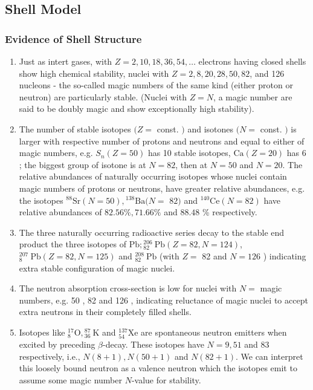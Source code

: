 \subsection{Shell Model}
\subsubsection{Evidence of Shell Structure}
\begin{enumerate}
	\item Just as intert gases, with $Z=2,10,18,36,54, \ldots$ electrons having closed shells show high chemical stability, nuclei with $Z=2,8,20,28,50,82$, and 126 nucleons - the so-called magic numbers of the same kind (either proton or neutron) are particularly stable. (Nuclei with $Z=N$, a magic number are said to be doubly magic and show exceptionally high stability).
	\item The number of stable isotopes $(Z=$ const. $)$ and isotones $(N=$ const. $)$ is larger with respective number of protons and neutrons and equal to either of magic numbers, e.g. $S_{n}(Z=50)$ has 10 stable isotopes, $\mathrm{Ca}(Z=20)$ has 6 ; the biggest group of isotone is at $N=82$, then at $N=50$ and $N=20$. The relative abundances of naturally occurring isotopes whose nuclei contain magic numbers of protons or neutrons, have greater relative abundances, e.g. the isotopes ${ }^{88} \mathrm{Sr}(N=50),{ }^{138} \mathrm{Ba}(N=$ $82)$ and ${ }^{140} \mathrm{Ce}(N=82)$ have relative abundances of $82.56 \%, 71.66 \%$ and $88.48$ \% respectively.
	\item The three naturally occurring radioactive series decay to the stable end product the three isotopes of $\mathrm{Pb} ;{ }_{82}^{206} \mathrm{~Pb}(Z=82, N=124)$, ${ }_{8}^{207} \mathrm{~Pb}(Z=82, N=125)$ and ${ }_{82}^{208} \mathrm{~Pb}$ (with $Z=$ 82 and $N=126$ ) indicating extra stable configuration of magic nuclei.
	\item The neutron absorption cross-section is low for nuclei with $N=$ magic numbers, e.g. 50 , 82 and 126 , indicating reluctance of magic nuclei to accept extra neutrons in their completely filled shells.
	\item Isotopes like ${ }_{8}^{17} \mathrm{O},{ }_{36}^{87} \mathrm{~K}$ and ${ }_{54}^{137} \mathrm{Xe}$ are spontaneous neutron emitters when excited by preceding $\beta$-decay. These isotopes have $N=9,51$ and 83 respectively, i.e., $N(8+1), N(50+1)$ and $N(82+1)$. We can interpret this loosely bound neutron as a valence neutron which the isotopes emit to assume some magic number $N$-value for stability.

\end{enumerate}
